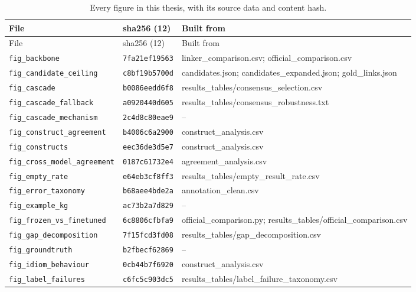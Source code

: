 \footnotesize
\begin{longtable}{@{}>{\raggedright\arraybackslash}p{4.5cm} >{\raggedright\arraybackslash}p{2.5cm} >{\raggedright\arraybackslash}p{6.5cm}@{}}
\caption{Every figure in this thesis, with its source data and content hash.}\label{tab:app-inventory}\\
\toprule File & sha256 (12) & Built from \\ \midrule
\endfirsthead
\toprule File & sha256 (12) & Built from \\ \midrule
\endhead
\bottomrule
\endlastfoot
\texttt{fig\_backbone} & \texttt{7fa21ef19563} & linker\_comparison.csv; official\_comparison.csv \\
\texttt{fig\_candidate\_ceiling} & \texttt{c8bf19b5700d} & candidates.json; candidates\_expanded.json; gold\_links.json \\
\texttt{fig\_cascade} & \texttt{b0086eedd6f8} & results\_tables/consensus\_selection.csv \\
\texttt{fig\_cascade\_fallback} & \texttt{a0920440d605} & results\_tables/consensus\_robustness.txt \\
\texttt{fig\_cascade\_mechanism} & \texttt{2c4d8c80eae9} & -- \\
\texttt{fig\_construct\_agreement} & \texttt{b4006c6a2900} & construct\_analysis.csv \\
\texttt{fig\_constructs} & \texttt{eec36de3d5e7} & construct\_analysis.csv \\
\texttt{fig\_cross\_model\_agreement} & \texttt{0187c61732e4} & agreement\_analysis.csv \\
\texttt{fig\_empty\_rate} & \texttt{e64eb3cf8ff3} & results\_tables/empty\_result\_rate.csv \\
\texttt{fig\_error\_taxonomy} & \texttt{b68aee4bde2a} & annotation\_clean.csv \\
\texttt{fig\_example\_kg} & \texttt{ac73b2a7d829} & -- \\
\texttt{fig\_frozen\_vs\_finetuned} & \texttt{6c8806cfbfa9} & official\_comparison.py; results\_tables/official\_comparison.csv \\
\texttt{fig\_gap\_decomposition} & \texttt{7f15fcd3fd08} & results\_tables/gap\_decomposition.csv \\
\texttt{fig\_groundtruth} & \texttt{b2fbecf62869} & -- \\
\texttt{fig\_idiom\_behaviour} & \texttt{0cb44b7f6920} & construct\_analysis.csv \\
\texttt{fig\_label\_failures} & \texttt{c6fc5c903dc5} & results\_tables/label\_failure\_taxonomy.csv \\

\end{longtable}
